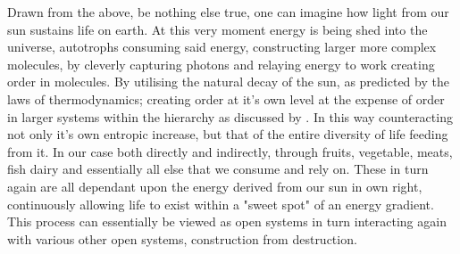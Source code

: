 Drawn from the above, be nothing else true, one can imagine how light from our sun sustains life on earth. At this very moment energy is being shed into the universe, \gls{autotrophs} consuming said energy, constructing larger more complex molecules, by cleverly capturing photons and relaying energy to work creating order in molecules. By utilising the natural decay of the sun, as predicted by the laws of thermodynamics; creating order at it's own level at the expense of order in larger systems within the hierarchy as discussed by \citeauthor{Bertalanffy1972}. In this way counteracting not only it's own entropic increase, but that of the entire diversity of life feeding from it. In our case both directly and indirectly, through fruits, vegetable, meats, fish dairy and essentially all else that we consume and rely on. These in turn again are all dependant upon the energy derived from our sun in own right, continuously allowing life to exist within a "sweet spot" of an energy gradient. This process can essentially be viewed as open systems in turn interacting again with various other open systems, construction from destruction. 

